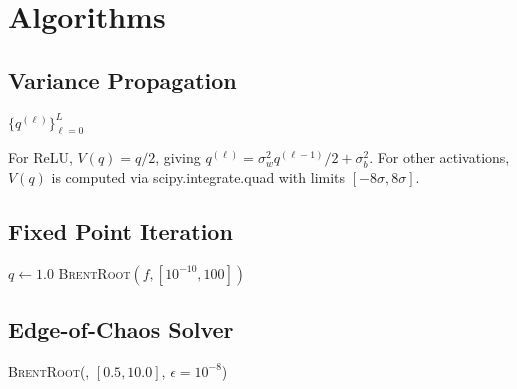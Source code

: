 \documentclass[10pt]{article}
\theoremstyle{definition}
\begin{document}
\section{Algorithms}
\label{app:algorithms}

\subsection{Variance Propagation}

\begin{algorithm}[H]
\SetAlgoLined
{}
\Return $\{q^{(\ell)}\}_{\ell=0}^{L}$\;
\caption{Forward Variance Propagation}
\label{alg:variance-prop}
\end{algorithm}

For ReLU, $V(q) = q/2$, giving $q^{(\ell)} = \sigma_w^2 q^{(\ell-1)}/2 + \sigma_b^2$.
For other activations, $V(q)$ is computed via scipy.integrate.quad with limits $[-8\sigma, 8\sigma]$.

\subsection{Fixed Point Iteration}

\begin{algorithm}[H]
\SetAlgoLined
{}
$q \leftarrow 1.0$\;
\Return \textsc{BrentRoot}$(f, [10^{-10}, 100])$\;
\caption{Fixed Point Iteration with Fallback}
\end{algorithm}

\subsection{Edge-of-Chaos Solver}

\begin{algorithm}[H]
\SetAlgoLined
{}
\Return \textsc{BrentRoot}(\ChiOne, $[0.5, 10.0]$, $\epsilon = 10^{-8}$)\;
\caption{Edge-of-Chaos Computation}
\label{alg:eoc}
\end{algorithm}
\end{document}
